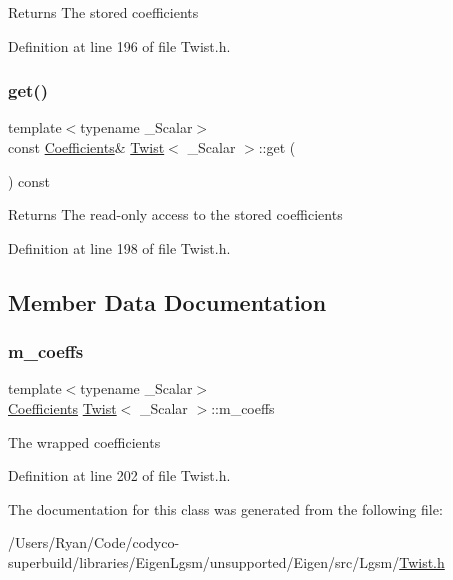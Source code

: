 \begin{DoxyReturn}{Returns}
The stored coefficients 
\end{DoxyReturn}


Definition at line 196 of file Twist.\+h.

\hypertarget{class_twist_a92329266374466e60daabe5ca6c2dcbe}{}\label{class_twist_a92329266374466e60daabe5ca6c2dcbe} 
\subsubsection{\texorpdfstring{get()}{get()}\hspace{0.1cm}{\footnotesize\ttfamily [2/2]}}
{\footnotesize\ttfamily template$<$typename \+\_\+\+Scalar$>$ \\
const \hyperlink{class_twist_a1bc0976a0f06b366421639350134222b}{Coefficients}\& \hyperlink{class_twist}{Twist}$<$ \+\_\+\+Scalar $>$\+::get (\begin{DoxyParamCaption}{ }\end{DoxyParamCaption}) const\hspace{0.3cm}{\ttfamily [inline]}}

\begin{DoxyReturn}{Returns}
The read-\/only access to the stored coefficients 
\end{DoxyReturn}


Definition at line 198 of file Twist.\+h.



\subsection{Member Data Documentation}
\hypertarget{class_twist_ac4b3ab83b5a42bc592b55dbb94905c4e}{}\label{class_twist_ac4b3ab83b5a42bc592b55dbb94905c4e} 
\subsubsection{\texorpdfstring{m\+\_\+coeffs}{m\_coeffs}}
{\footnotesize\ttfamily template$<$typename \+\_\+\+Scalar$>$ \\
\hyperlink{class_twist_a1bc0976a0f06b366421639350134222b}{Coefficients} \hyperlink{class_twist}{Twist}$<$ \+\_\+\+Scalar $>$\+::m\+\_\+coeffs\hspace{0.3cm}{\ttfamily [protected]}}

The wrapped coefficients 

Definition at line 202 of file Twist.\+h.



The documentation for this class was generated from the following file\+:\begin{DoxyCompactItemize}
\item 
/\+Users/\+Ryan/\+Code/codyco-\/superbuild/libraries/\+Eigen\+Lgsm/unsupported/\+Eigen/src/\+Lgsm/\hyperlink{_twist_8h}{Twist.\+h}\end{DoxyCompactItemize}
